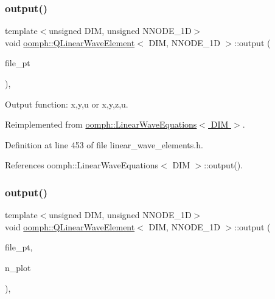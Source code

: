 \mbox{\label{classoomph_1_1QLinearWaveElement_a9b6c23f23a7f8e188241fe2698c7543d}} 
\subsubsection{\texorpdfstring{output()}{output()}\hspace{0.1cm}{\footnotesize\ttfamily [3/4]}}
{\footnotesize\ttfamily template$<$unsigned D\+IM, unsigned N\+N\+O\+D\+E\+\_\+1D$>$ \\
void \hyperlink{classoomph_1_1QLinearWaveElement}{oomph\+::\+Q\+Linear\+Wave\+Element}$<$ D\+IM, N\+N\+O\+D\+E\+\_\+1D $>$\+::output (\begin{DoxyParamCaption}\item[{F\+I\+LE $\ast$}]{file\+\_\+pt }\end{DoxyParamCaption})\hspace{0.3cm}{\ttfamily [inline]}, {\ttfamily [virtual]}}



Output function\+: x,y,u or x,y,z,u. 



Reimplemented from \hyperlink{classoomph_1_1LinearWaveEquations_a7a1464dbadf5fb3542979951b389694b}{oomph\+::\+Linear\+Wave\+Equations$<$ D\+I\+M $>$}.



Definition at line 453 of file linear\+\_\+wave\+\_\+elements.\+h.



References oomph\+::\+Linear\+Wave\+Equations$<$ D\+I\+M $>$\+::output().

\mbox{\label{classoomph_1_1QLinearWaveElement_a4fe8053385a090049e459faa0e0cc3be}} 
\subsubsection{\texorpdfstring{output()}{output()}\hspace{0.1cm}{\footnotesize\ttfamily [4/4]}}
{\footnotesize\ttfamily template$<$unsigned D\+IM, unsigned N\+N\+O\+D\+E\+\_\+1D$>$ \\
void \hyperlink{classoomph_1_1QLinearWaveElement}{oomph\+::\+Q\+Linear\+Wave\+Element}$<$ D\+IM, N\+N\+O\+D\+E\+\_\+1D $>$\+::output (\begin{DoxyParamCaption}\item[{F\+I\+LE $\ast$}]{file\+\_\+pt,  }\item[{const unsigned \&}]{n\+\_\+plot }\end{DoxyParamCaption})\hspace{0.3cm}{\ttfamily [inline]}, {\ttfamily [virtual]}}



